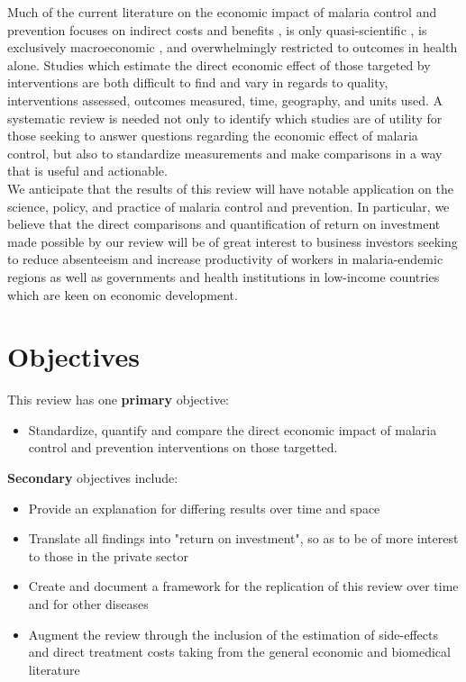 \documentclass{article}
\begin{document}
\noindent Much of the current literature on the economic impact of malaria control and prevention focuses on indirect costs and benefits \cite{Gallup1998}, is only quasi-scientific \cite{rbm2011}, is exclusively macroeconomic \cite{Hsiao2015} \cite{Zafar2007} \cite{Carstensen2006}, and overwhelmingly restricted to outcomes in health alone. Studies which estimate the direct economic effect of those targeted by interventions are both difficult to find and vary in regards to quality, interventions assessed,  outcomes measured, time, geography, and units used. A systematic review is needed not only to identify which studies are of utility for those seeking to answer questions regarding the economic effect of malaria control, but also to standardize measurements and make comparisons in a way that is useful and actionable. \\

\noindent We anticipate that the results of this review will have notable application on the science, policy, and practice of malaria control and prevention. In particular, we believe that the direct comparisons and quantification of return on investment made possible by our review will be of great interest to business investors seeking to reduce absenteeism and increase productivity of workers in malaria-endemic regions as well as governments and health institutions in low-income countries which are keen on economic development. 



\section*{Objectives}

This review has one \textbf{primary} objective: \\ 

\begin{itemize}
\item Standardize, quantify and compare the direct economic impact of malaria control and prevention interventions on those targetted. \\
\end{itemize}


\noindent \textbf{Secondary} objectives include: 
\begin{itemize}
  \setlength\itemsep{-0.2em}


\item Provide an explanation for differing results over time and space 
\item Translate all findings into "return on investment", so as to be of more interest to those in the private sector
\item Create and document a framework for the replication of this review over time and for other diseases  
\item Augment the review through the inclusion of the estimation of side-effects and direct treatment costs taking from the general economic and biomedical literature
\end{itemize}
\end{document}
